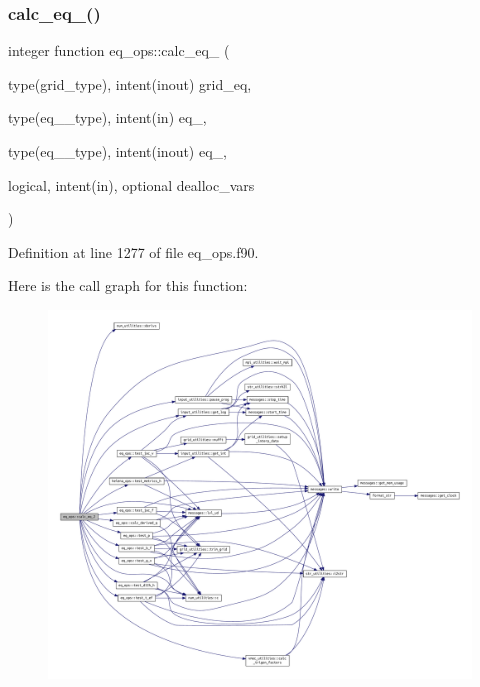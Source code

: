 \subsubsection{\texorpdfstring{calc\+\_\+eq\+\_()}{calc\_eq\_2()}}
{\footnotesize\ttfamily integer function eq\+\_\+ops\+::calc\+\_\+eq\+\_ (\begin{DoxyParamCaption}\item[{type(grid\+\_\+type), intent(inout)}]{grid\+\_\+eq,  }\item[{type(eq\+\_\+1\+\_\+type), intent(in)}]{eq\+\_,  }\item[{type(eq\+\_\+2\+\_\+type), intent(inout)}]{eq\+\_,  }\item[{logical, intent(in), optional}]{dealloc\+\_\+vars }\end{DoxyParamCaption})}



Definition at line 1277 of file eq\+\_\+ops.\+f90.

Here is the call graph for this function\+:
\nopagebreak
\begin{figure}[H]
\begin{center}
\leavevmode
\includegraphics[width=350pt]{namespaceeq__ops_a91256e08dadab2ccbabd66cf369c43a5_cgraph}
\end{center}
\end{figure}
\mbox{\label{namespaceeq__ops_a4e20b8725fce149449f83754244dc84e}} 
